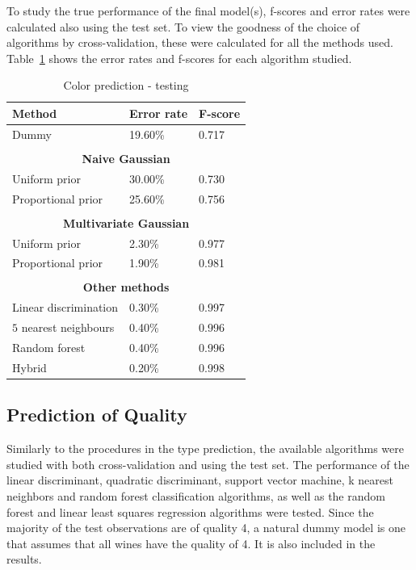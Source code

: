 \documentclass[twoside]{article}
\begin{document}
\begin{multicols}{2}
To study the true performance of the final model(s), f-scores and error rates were calculated also using the test set. To view
the goodness of the choice of algorithms by cross-validation, these were calculated for all the methods used. 
Table~\ref{table:color_testing} shows the error rates and f-scores for each algorithm studied.

\begin{table}[H]
\caption{Color prediction - testing}
\label{table:color_testing}
\begin{tabular}{lll}
\textbf{Method} & \textbf{Error rate} & \textbf{F-score}\\
\midrule
Dummy & 19.60\% & 0.717 \\
\\
\multicolumn{3}{c}{\textbf{Naive Gaussian}} \\
Uniform prior & 30.00\% & 0.730 \\
Proportional prior & 25.60\% & 0.756 \\
\\
\multicolumn{3}{c}{\textbf{Multivariate Gaussian}} \\
Uniform prior & 2.30\% & 0.977 \\
Proportional prior & 1.90\% & 0.981 \\
\\
\multicolumn{3}{c}{\textbf{Other methods}} \\
Linear discrimination & 0.30\% & 0.997 \\
$5$ nearest neighbours & 0.40\% & 0.996 \\
Random forest & 0.40\% & 0.996 \\
Hybrid & 0.20\% & 0.998 \\

\end{tabular}
\end{table}

\subsection{Prediction of Quality}

Similarly to the procedures in the type prediction, the available algorithms were studied with both cross-validation and using the test set. 
The performance of the linear discriminant, quadratic discriminant, support vector machine, k nearest neighbors and random forest
classification algorithms, as well as the random forest and linear least squares regression algorithms were tested.
Since the majority of the test observations are of quality 4, a natural dummy model is one that assumes that all wines have the quality of 4.
It is also included in the results.


\end{multicols}
\end{document}
